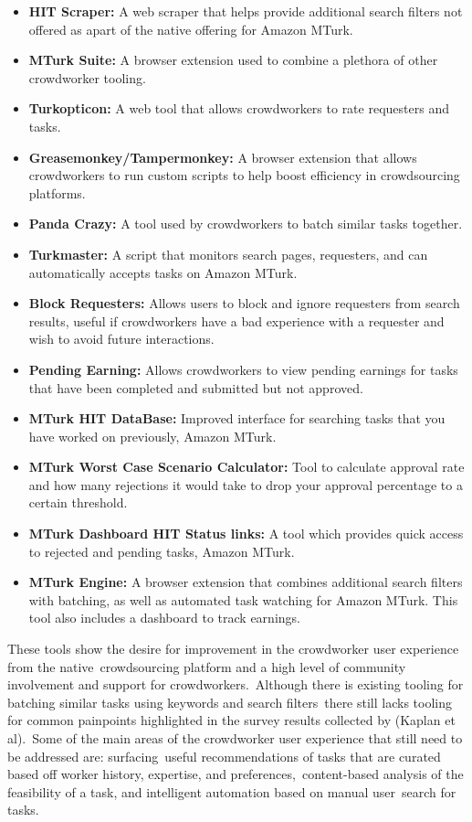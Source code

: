 \documentclass[letterpaper,12pt]{article}
\begin{document}
\begin{itemize}
	\item \textbf{HIT Scraper:} A web scraper that helps provide additional search filters not offered as apart of the native offering for Amazon MTurk.
	\item \textbf{MTurk Suite:} A browser extension used to combine a plethora of other crowdworker tooling.
	\item \textbf{Turkopticon:} A web tool that allows crowdworkers to rate requesters and tasks.
	\item \textbf{Greasemonkey/Tampermonkey:} A browser extension that allows crowdworkers to run custom scripts to help boost efficiency in crowdsourcing platforms.
	\item \textbf{Panda Crazy:} A tool used by crowdworkers to batch similar tasks together.
	\item \textbf{Turkmaster:} A script that monitors search pages, requesters, and can automatically accepts tasks on Amazon MTurk.
	\item \textbf{Block Requesters:} Allows users to block and ignore requesters from search results, useful if crowdworkers have a bad experience with a requester and wish to avoid future interactions.
	\item \textbf{Pending Earning:} Allows crowdworkers to view pending earnings for tasks that have been completed and submitted but not approved.
	\item \textbf{MTurk HIT DataBase:} Improved interface for searching tasks that you have worked on previously, Amazon MTurk.
	\item \textbf{MTurk Worst Case Scenario Calculator:} Tool to calculate approval rate and how many rejections it would take to drop your approval percentage to a certain threshold.
	\item \textbf{MTurk Dashboard HIT Status links:} A tool which provides quick access to rejected and pending tasks, Amazon MTurk.
	\item \textbf{MTurk Engine:} A browser extension that combines additional search filters with batching, as well as automated task watching for Amazon MTurk. This tool also includes a dashboard to track earnings.
\end{itemize}

These tools show the desire for improvement in the crowdworker user experience from the native\
crowdsourcing platform and a high level of community involvement and support for crowdworkers.\
Although there is existing tooling for batching similar tasks using keywords and search filters\
there still lacks tooling for common painpoints highlighted in the survey results collected by (Kaplan et al).\
Some of the main areas of the crowdworker user experience that still need to be addressed are: surfacing\
useful recommendations of tasks that are curated based off worker history, expertise, and preferences,\
content-based analysis of the feasibility of a task, and intelligent automation based on manual user\
search for tasks.
\end{document}
